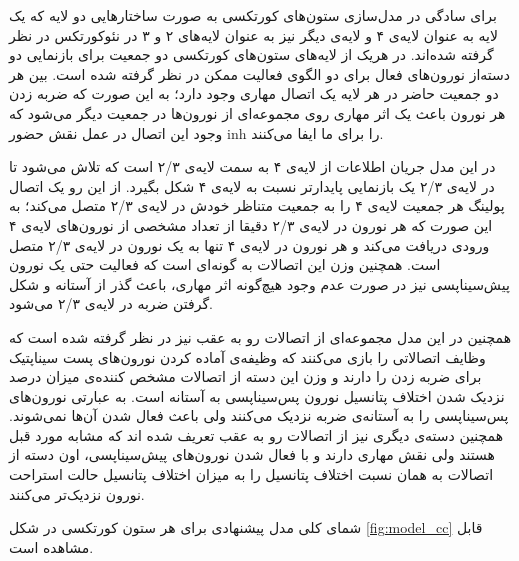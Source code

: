 \documentclass[12pt]{report}
\begin{document}
	برای سادگی در مدل‌سازی ستون‌های کورتکسی به صورت ساختارهایی دو لایه که یک لایه به عنوان لایه‌ی ۴ و لایه‌ی دیگر نیز به عنوان لایه‌‌های ۲ و ۳ در نئوکورتکس در نظر گرفته شده‌اند. در هریک از لایه‌های ستون‌های کورتکسی دو جمعیت برای بازنمایی دو دسته‌از نورون‌های فعال برای دو الگوی فعالیت ممکن در نظر گرفته شده است. بین هر دو جمعیت حاضر در هر لایه یک اتصال مهاری وجود دارد؛ به این صورت که ضربه زدن هر نورون باعث یک اثر مهاری روی مجموعه‌ای از نورون‌ها در جمعیت دیگر می‌شود که وجود این اتصال در عمل نقش حضور \gls{inh} را برای ما ایفا می‌کنند.
	
	در این مدل جریان اطلاعات از لایه‌ی ۴ به سمت لایه‌ی‌ ۲/۳ است که تلاش می‌شود تا در لایه‌ی ۲/۳ یک بازنمایی پایدار‌تر نسبت به لایه‌ی ۴ شکل بگیرد. از این رو یک اتصال پولینگ هر جمعیت لایه‌ی ۴ را به جمعیت متناظر خودش در لایه‌ی ۲/۳ متصل می‌کند؛ به این صورت که هر نورون در لایه‌ی ۲/۳ دقیقا از تعداد مشخصی از نورون‌های لایه‌ی ۴ ورودی دریافت می‌کند و هر نورون در لایه‌ی ۴ تنها به یک نورون در لایه‌ی ۲/۳ متصل است. همچنین وزن این اتصالات به گونه‌ای است که فعالیت حتی یک نورون پیش‌سیناپسی نیز در صورت عدم وجود هیچ‌گونه اثر مهاری، باعث گذر از آستانه و شکل گرفتن ضربه در لایه‌ی ۲/۳ می‌شود. 
	
	همچنین در این مدل مجموعه‌ای از اتصالات رو به عقب نیز در نظر گرفته شده است که وظایف اتصالاتی را بازی می‌کنند که وظیفه‌ی آماده کردن نورون‌های پست سیناپتیک برای ضربه زدن را دارند و وزن این دسته از اتصالات مشخص کننده‌ی میزان درصد نزدیک شدن اختلاف پتانسیل نورون پس‌سیناپسی به آستانه است. به عبارتی نورون‌های پس‌سیناپسی را به آستانه‌ی ضربه نزدیک می‌کنند ولی باعث فعال شدن آن‌ها نمی‌شوند. همچنین دسته‌ی دیگری نیز از اتصالات رو به عقب تعریف شده اند که مشابه مورد قبل هستند ولی نقش مهاری دارند و با فعال شدن نورون‌های پیش‌سیناپسی، اون دسته از اتصالات به همان نسبت اختلاف پتانسیل را به میزان اختلاف پتانسیل حالت استراحت نورون نزدیک‌تر می‌کنند.
	
	شمای کلی مدل پیشنهادی برای هر ستون کورتکسی در شکل \ref{fig:model_cc} قابل مشاهده است. 
	
\end{document}

